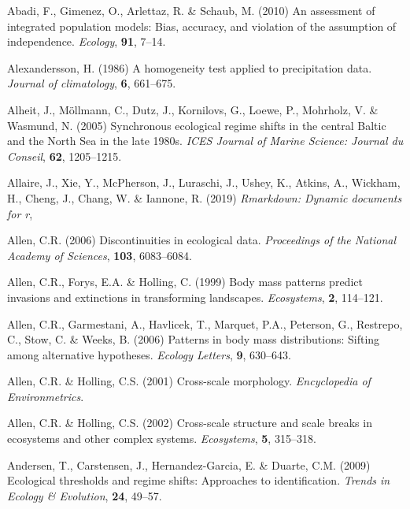 \documentclass[12pt,twoside,openany]{reedthesis}
\begin{document}
\setlength{\parindent}{-0.20in}
\setlength{\leftskip}{0.20in}
\setlength{\parskip}{8pt}

\hypertarget{refs}{}
\leavevmode\hypertarget{ref-abadi2010assessment}{}%
Abadi, F., Gimenez, O., Arlettaz, R. \& Schaub, M. (2010) An assessment of integrated population models: Bias, accuracy, and violation of the assumption of independence. \emph{Ecology}, \textbf{91}, 7--14.

\leavevmode\hypertarget{ref-alexandersson1986homogeneity}{}%
Alexandersson, H. (1986) A homogeneity test applied to precipitation data. \emph{Journal of climatology}, \textbf{6}, 661--675.

\leavevmode\hypertarget{ref-alheit_synchronous_2005}{}%
Alheit, J., Möllmann, C., Dutz, J., Kornilovs, G., Loewe, P., Mohrholz, V. \& Wasmund, N. (2005) Synchronous ecological regime shifts in the central Baltic and the North Sea in the late 1980s. \emph{ICES Journal of Marine Science: Journal du Conseil}, \textbf{62}, 1205--1215.

\leavevmode\hypertarget{ref-rmarkdown}{}%
Allaire, J., Xie, Y., McPherson, J., Luraschi, J., Ushey, K., Atkins, A., Wickham, H., Cheng, J., Chang, W. \& Iannone, R. (2019) \emph{Rmarkdown: Dynamic documents for r},

\leavevmode\hypertarget{ref-allen2006discontinuities}{}%
Allen, C.R. (2006) Discontinuities in ecological data. \emph{Proceedings of the National Academy of Sciences}, \textbf{103}, 6083--6084.

\leavevmode\hypertarget{ref-allen1999body}{}%
Allen, C.R., Forys, E.A. \& Holling, C. (1999) Body mass patterns predict invasions and extinctions in transforming landscapes. \emph{Ecosystems}, \textbf{2}, 114--121.

\leavevmode\hypertarget{ref-allen2006patterns}{}%
Allen, C.R., Garmestani, A., Havlicek, T., Marquet, P.A., Peterson, G., Restrepo, C., Stow, C. \& Weeks, B. (2006) Patterns in body mass distributions: Sifting among alternative hypotheses. \emph{Ecology Letters}, \textbf{9}, 630--643.

\leavevmode\hypertarget{ref-allen2001cross}{}%
Allen, C.R. \& Holling, C.S. (2001) Cross-scale morphology. \emph{Encyclopedia of Environmetrics}.

\leavevmode\hypertarget{ref-allen2002cross}{}%
Allen, C.R. \& Holling, C.S. (2002) Cross-scale structure and scale breaks in ecosystems and other complex systems. \emph{Ecosystems}, \textbf{5}, 315--318.

\leavevmode\hypertarget{ref-andersen_ecological_2009}{}%
Andersen, T., Carstensen, J., Hernandez-Garcia, E. \& Duarte, C.M. (2009) Ecological thresholds and regime shifts: Approaches to identification. \emph{Trends in Ecology \& Evolution}, \textbf{24}, 49--57.
\end{document}
